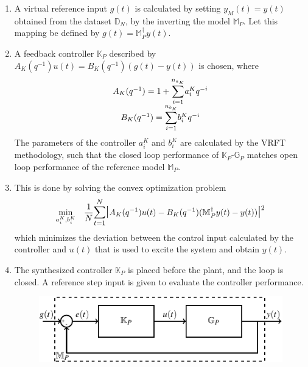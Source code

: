 \documentclass[letterpaper, 10 pt, conference]{ieeeconf}  %
\begin{document}
\begin{enumerate}
	\item
	A virtual reference input $g(t)$ is calculated by setting $y_M(t)=y(t)$ obtained from the dataset $\mathbb{D}_N$, by the inverting the model $\mathbb{M}_P$. Let this mapping be defined by $g(t) = \mathbb{M}_P^{\dagger}y(t) $.
	\item
	A feedback controller $\mathbb{K}_P$ described by $A_K(q^{-1})u(t) = B_K(q^{-1})(g(t)-y(t))$ is chosen, where 
	\begin{equation*}
	\begin{matrix}
	A_K(q^{-1}) = 1+\mathlarger{\sum\limits_{i=1}^{n_{a_K}}}a_i^Kq^{-i}\\
	B_K(q^{-1}) = \mathlarger{\sum\limits_{i=1}^{n_{b_K}}}b_i^Kq^{-i}
	\end{matrix}  
	\end{equation*}
	The parameters of the controller $a_i^K$ and $b_i^K$ are calculated by the VRFT methodology, such that the closed loop performance of $\mathbb{K}_P$-$\mathbb{G}_P$ matches open loop performance of  the reference model $\mathbb{M}_P$.
	\item
	This is done by solving the convex optimization problem
	\begin{equation}
	\begin{aligned}
	& \underset{a_i^K,b_i^K}{\text{min}}
	& & \frac{1}{N}\mathlarger{\sum\limits_{t=1}^N}\mathlarger{\mathlarger{|}}A_K(q^{-1})u(t)-B_K(q^{-1})(\mathbb{M}_P^{\dagger}y(t)-y(t))\mathlarger{\mathlarger{|}}^2 \\
	\end{aligned}
	\label{VRFT_problem}
	\end{equation}
	which minimizes the deviation between the control input calculated by the controller and $u(t)$ that is used to excite the system and obtain $y(t)$.
	\item
	The synthesized controller $\mathbb{K}_P$ is placed before the plant, and the loop is closed. A reference step input is given to evaluate the controller performance.
	\begin{figure}[h]
		\hspace{25pt}
	\includegraphics[scale=0.8]{KpGp.pdf}

\end{figure}
\end{enumerate}
\end{document}
